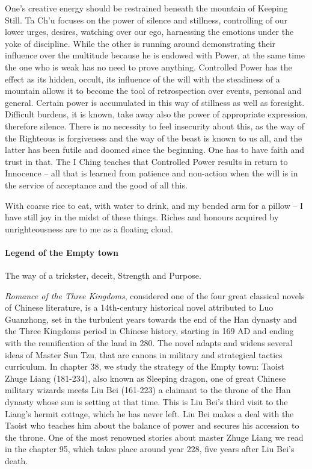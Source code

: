 One's creative energy should be restrained beneath the mountain of Keeping Still. Ta Ch'u focuses on the power of silence and stillness, controlling of our lower urges, desires, watching over our ego, harnessing the emotions under the yoke of discipline. While the other is running around demonstrating their influence over the multitude because he is endowed with Power, at the same time the one who is weak has no need to prove anything. Controlled Power has the effect as its hidden, occult, its influence of the will with the steadiness of a mountain allows it to become the tool of retrospection over events, personal and general. Certain power is accumulated in this way of stillness as well as foresight. Difficult burdens, it is known, take away also the power of appropriate expression, therefore silence. There is no necessity to feel insecurity about this, as the way of the Righteous is forgiveness and the way of the beast is known to us all, and the latter has been futile and doomed since the beginning. One has to have faith and trust in that. The I Ching teaches that Controlled Power results in return to Innocence -- all that is learned from patience and non-action when the will is in the service of acceptance and the good of all this.

\begin{quotex}
With coarse rice to eat, with water to drink, and my bended arm for a pillow -- I have still joy in the midst of these things. Riches and honours acquired by unrighteousness are to me as a floating cloud.
\end{quotex}


\paragraph{Legend of the Empty town}


The way of a trickster, deceit, Strength and Purpose.

\emph{Romance of the Three Kingdoms}, considered one of the four great classical novels of Chinese literature, is a 14th-century historical novel attributed to Luo Guanzhong, set in the turbulent years towards the end of the Han dynasty and the Three Kingdoms period in Chinese history, starting in 169 AD and ending with the reunification of the land in 280. The novel adapts and widens several ideas of Master Sun Tzu, that are canons in military and strategical tactics curriculum. In chapter 38, we study the strategy of the Empty town: Taoist Zhuge Liang (181-234), also known as Sleeping dragon, one of great Chinese military wizards meets Liu Bei (161-223) a claimant to the throne of the Han dynasty whose sun is setting at that time. This is Liu Bei's third visit to the Liang's hermit cottage, which he has never left. Liu Bei makes a deal with the Taoist who teaches him about the balance of power and secures his accession to the throne. One of the most renowned stories about master Zhuge Liang we read in the chapter 95, which takes place around year 228, five years after Liu Bei's death.

